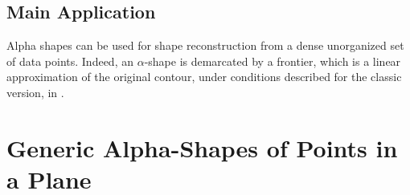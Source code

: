 \subsection*{Main Application}

Alpha shapes can be used for shape reconstruction from a dense unorganized set
of data points. Indeed, an  $\alpha$-shape is demarcated by a frontier, which is
a linear approximation of the original contour, under conditions described for
the classic version, in \cite{bb-srmua-97t}.


\section{Generic Alpha-Shapes of Points in a Plane \label{I1_SectAlpha_Shape_2}}

